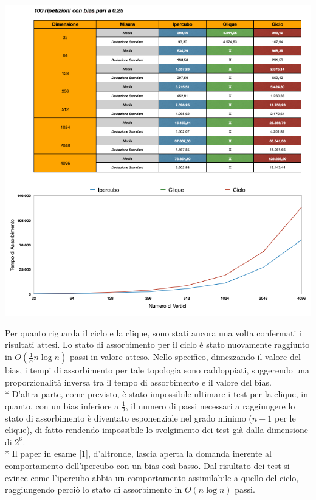 \documentclass{article}
\begin{document}
\begin{center}
\includegraphics[width=1\textwidth]{Test/test_bias025.png}
\end{center}
Per quanto riguarda il ciclo e la clique, sono stati ancora una volta confermati i risultati attesi.
Lo stato di assorbimento per il ciclo è stato nuovamente raggiunto in $O(\frac{1}{\alpha}n\log{}n)$ passi in valore atteso. Nello specifico, dimezzando il valore del bias, i tempi di assorbimento per tale topologia sono raddoppiati, suggerendo una proporzionalità inversa tra il tempo di assorbimento e il valore del bias.\\*
D'altra parte, come previsto, è stato impossibile ultimare i test per la clique, in quanto, con un bias inferiore a $\frac{1}{2}$, il numero di passi necessari a raggiungere lo stato di assorbimento è diventato esponenziale nel grado minimo ($n-1$ per le clique), di fatto rendendo impossibile lo svolgimento dei test già dalla dimensione di $2^{6^{\mathrm{}}}$.\\*
Il paper in esame [1], d'altronde, lascia aperta la domanda inerente al comportamento dell'ipercubo con un bias così basso. Dal risultato dei test si evince come l'ipercubo abbia un comportamento assimilabile a quello del ciclo, raggiungendo perciò lo stato di assorbimento in $O(n\log{}n)$ passi.
\end{document}
